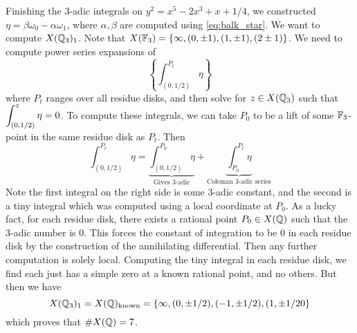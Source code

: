 Finishing the 3-adic integrals on $y^2= x^5 - 2x^3 + x + 1/4$, we constructed $\eta= \beta \omega_0 - \alpha \omega_1$, where $\alpha,\beta$ are computed using \eqref{eq:balk_star}. We want to compute $X(\mathbb{Q}_3)_1$. Note that $X(\mathbb{F}_3)= \{ \infty, (0,\pm1), (1,\pm 1),(2\pm1) \}$. We need to compute power series expansions of
	\[
	\left\{ \int_{(0,1/2)}^{P_t} \eta \right\}
	\]
where $P_t$ ranges over all residue disks, and then solve for $z \in X(\mathbb{Q}_3)$ such that $\displaystyle \int_{(0,1/2)}^z \eta= 0$. To compute these integrals, we can take $P_0$ to be a lift of some $\mathbb{F}_3$-point in the same residue disk as $P_t$. Then
	\[
	\int_{(0,1/2)}^{P_t} \eta= \underbrace{\int_{(0,1/2)}^{P_0} \eta}_{\text{Gives 3-adic}} + \underbrace{\int_{P_0}^{P_t} \eta}_{\text{Coleman 3-adic series}}
	\]
Note the first integral on the right side is some 3-adic constant, and the second is a tiny integral which was computed using a local coordinate at $P_0$. As a lucky fact, for each residue disk, there exists a rational point $P_0 \in X(\mathbb{Q})$ such that the 3-adic number is 0. This forces the constant of integration to be 0 in each residue disk by the construction of the annihilating differential. Then any further computation is solely local. Computing the tiny integral in each residue disk, we find each just has a simple zero at a known rational point, and no others. But then we have
	\[
	X(\mathbb{Q}_3)_1= X(\mathbb{Q})_{\text{known}}= \{ \infty, (0,\pm 1/2), (-1,\pm1/2), (1,\pm 1/20 \}
	\]
which proves that $\#X(\mathbb{Q})= 7$. 

 